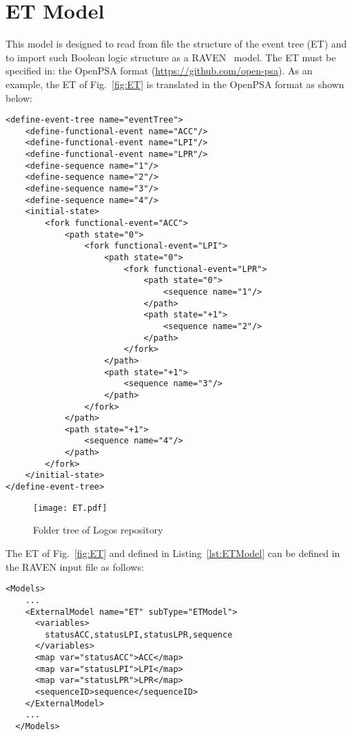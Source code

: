\section{ET Model}
\label{sec:ETModel}

This model is designed to read from file the structure of the event tree (ET) and to
import such Boolean logic structure as a RAVEN~\cite{RAVEN,RAVENtheoryMan} model.
The ET must be specified in: the OpenPSA format (\href{<url>}{https://github.com/open-psa}).
As an example, the ET of Fig.~\ref{fig:ET} is translated in the OpenPSA format as shown below:

\begin{lstlisting}[style=XML,morekeywords={anAttribute},caption=ET of Fig.~\ref{fig:ET} in OpenPSA format., label=lst:ETModel]
<define-event-tree name="eventTree">
    <define-functional-event name="ACC"/>
    <define-functional-event name="LPI"/>
    <define-functional-event name="LPR"/>
    <define-sequence name="1"/>
    <define-sequence name="2"/>
    <define-sequence name="3"/>
    <define-sequence name="4"/>
    <initial-state>
        <fork functional-event="ACC">
            <path state="0">
                <fork functional-event="LPI">
                    <path state="0">
                        <fork functional-event="LPR">
                            <path state="0">
                                <sequence name="1"/>
                            </path>
                            <path state="+1">
                                <sequence name="2"/>
                            </path>
                        </fork>
                    </path>
                    <path state="+1">
                        <sequence name="3"/>
                    </path>
                </fork>
            </path>
            <path state="+1">
                <sequence name="4"/>
            </path>
        </fork>
    </initial-state>
</define-event-tree>
\end{lstlisting}

\begin{figure}
    \centering
    \centerline{\texttt{[image: ET.pdf]}}
    \caption{Folder tree of Logos repository}
    \label{fig:Logos}
\end{figure}

The ET of Fig.~\ref{fig:ET} and defined in Listing~\ref{lst:ETModel} can be defined in the RAVEN input file as follows:
\begin{lstlisting}[style=XML,morekeywords={anAttribute},caption=ET model input example., label=lst:ET_InputExample]
  <Models>
    ...
    <ExternalModel name="ET" subType="ETModel">
      <variables>
        statusACC,statusLPI,statusLPR,sequence
      </variables>
      <map var="statusACC">ACC</map>
      <map var="statusLPI">LPI</map>
      <map var="statusLPR">LPR</map>
      <sequenceID>sequence</sequenceID>
    </ExternalModel>
    ...
  </Models>
\end{lstlisting}

